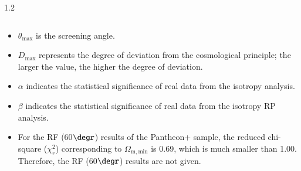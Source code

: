 \documentclass{aa}
\begin{document}
\begin{table}
\begin{spacing}{1.2}
\begin{tabular}{ccccccccc}
                        \hline\hline
                \end{tabular}
                \begin{itemize} 
                        \tiny
                        \item[\rm{$^{a}$}] $\theta_\mathrm{max}$ is the screening angle.
                        \item[\rm{$^{b}$}] $D_\mathrm{max}$ represents the degree of deviation from the cosmological principle; the larger the value, the higher the degree of deviation.
                        \item[\rm{$^{c}$}] $\alpha$ indicates the statistical significance of real data from the isotropy analysis.
                        \item[\rm{$^{d}$}] $\beta$ indicates the statistical significance of real data from the isotropy RP analysis.
                        \item[\rm{$^{*}$}] For the RF (60$\degr$) results of the Pantheon+ sample, the reduced chi-square ($\chi^{2}_{r}$) corresponding to $\Omega_\mathrm{m, min}$ is 0.69, which is much smaller than 1.00. Therefore, the RF (60$\degr$) results are not given.
                \end{itemize}
        \end{spacing}
\end{table}
\end{document}

